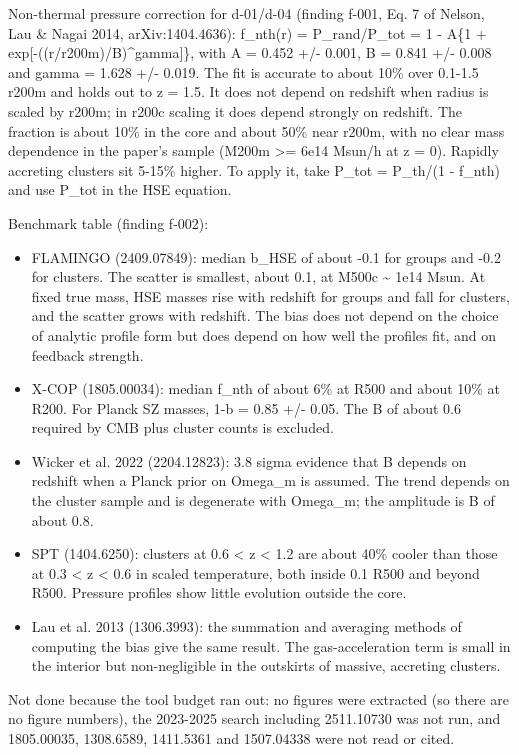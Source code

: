 \documentclass[11pt,a4paper]{article}
\begin{document}
Non-thermal pressure correction for d-01/d-04 (finding f-001, Eq. 7 of Nelson, Lau \& Nagai 2014, arXiv:1404.4636): f\_nth(r) = P\_rand/P\_tot = 1 - A\{1 + exp[-((r/r200m)/B)\textasciicircum{}gamma]\}, with A = 0.452 +/- 0.001, B = 0.841 +/- 0.008 and gamma = 1.628 +/- 0.019. The fit is accurate to about 10\% over 0.1-1.5 r200m and holds out to z = 1.5. It does not depend on redshift when radius is scaled by r200m; in r200c scaling it does depend strongly on redshift. The fraction is about 10\% in the core and about 50\% near r200m, with no clear mass dependence in the paper's sample (M200m \textgreater{}= 6e14 Msun/h at z = 0). Rapidly accreting clusters sit 5-15\% higher. To apply it, take P\_tot = P\_th/(1 - f\_nth) and use P\_tot in the HSE equation.

Benchmark table (finding f-002):

\begin{itemize}
  \item FLAMINGO (2409.07849): median b\_HSE of about -0.1 for groups and -0.2 for clusters. The scatter is smallest, about 0.1, at M500c \textasciitilde{} 1e14 Msun. At fixed true mass, HSE masses rise with redshift for groups and fall for clusters, and the scatter grows with redshift. The bias does not depend on the choice of analytic profile form but does depend on how well the profiles fit, and on feedback strength.
  \item X-COP (1805.00034): median f\_nth of about 6\% at R500 and about 10\% at R200. For Planck SZ masses, 1-b = 0.85 +/- 0.05. The B of about 0.6 required by CMB plus cluster counts is excluded.
  \item Wicker et al. 2022 (2204.12823): 3.8 sigma evidence that B depends on redshift when a Planck prior on Omega\_m is assumed. The trend depends on the cluster sample and is degenerate with Omega\_m; the amplitude is B of about 0.8.
  \item SPT (1404.6250): clusters at 0.6 \textless{} z \textless{} 1.2 are about 40\% cooler than those at 0.3 \textless{} z \textless{} 0.6 in scaled temperature, both inside 0.1 R500 and beyond R500. Pressure profiles show little evolution outside the core.
  \item Lau et al. 2013 (1306.3993): the summation and averaging methods of computing the bias give the same result. The gas-acceleration term is small in the interior but non-negligible in the outskirts of massive, accreting clusters.
\end{itemize}
Not done because the tool budget ran out: no figures were extracted (so there are no figure numbers), the 2023-2025 search including 2511.10730 was not run, and 1805.00035, 1308.6589, 1411.5361 and 1507.04338 were not read or cited.
\end{document}
